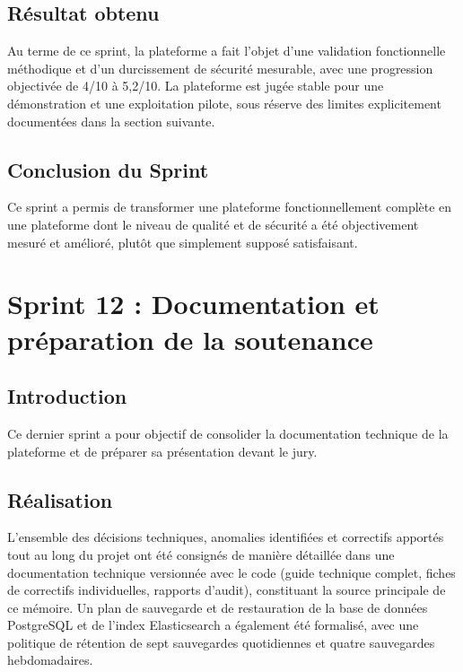 \subsection{Résultat obtenu}

Au terme de ce sprint, la plateforme a fait l'objet d'une validation fonctionnelle méthodique et d'un durcissement de sécurité mesurable, avec une progression objectivée de 4/10 à 5{,}2/10. La plateforme est jugée stable pour une démonstration et une exploitation pilote, sous réserve des limites explicitement documentées dans la section suivante.

\subsection{Conclusion du Sprint}

Ce sprint a permis de transformer une plateforme fonctionnellement complète en une plateforme dont le niveau de qualité et de sécurité a été objectivement mesuré et amélioré, plutôt que simplement supposé satisfaisant.


\section{Sprint 12 : Documentation et préparation de la soutenance}

\subsection{Introduction}

Ce dernier sprint a pour objectif de consolider la documentation technique de la plateforme et de préparer sa présentation devant le jury.

\subsection{Réalisation}

L'ensemble des décisions techniques, anomalies identifiées et correctifs apportés tout au long du projet ont été consignés de manière détaillée dans une documentation technique versionnée avec le code (guide technique complet, fiches de correctifs individuelles, rapports d'audit), constituant la source principale de ce mémoire. Un plan de sauvegarde et de restauration de la base de données PostgreSQL et de l'index Elasticsearch a également été formalisé, avec une politique de rétention de sept sauvegardes quotidiennes et quatre sauvegardes hebdomadaires.


